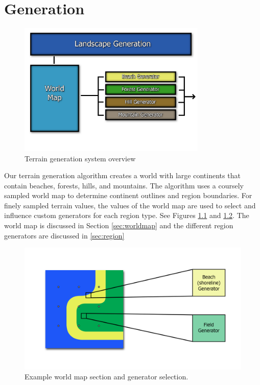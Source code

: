 
\chapter{Generation}

\begin{figure}
  \centering
    \includegraphics[width=0.8\textwidth]{figures/GeneratorSystem}
  \caption{Terrain generation system overview}
  \label{fig:gen_overview}
\end{figure}

Our terrain generation algorithm creates a world with large continents that contain beaches, forests, hills, and mountains.
The algorithm uses a coursely sampled world map to determine continent outlines and region boundaries.
For finely sampled terrain values, the values of the world map are used to select and influence custom generators for each region type.
See Figures \ref{fig:gen_overview} and \ref{fig:worldmap}.
The world map is discussed in Section \ref{sec:worldmap} and the different region generators are discussed in \ref{sec:region}

\begin{figure}
	\centering
		\includegraphics[width=1.0\textwidth]{figures/worldmap.png}
	\caption{Example world map section and generator selection.}
	\label{fig:worldmap}
\end{figure}

